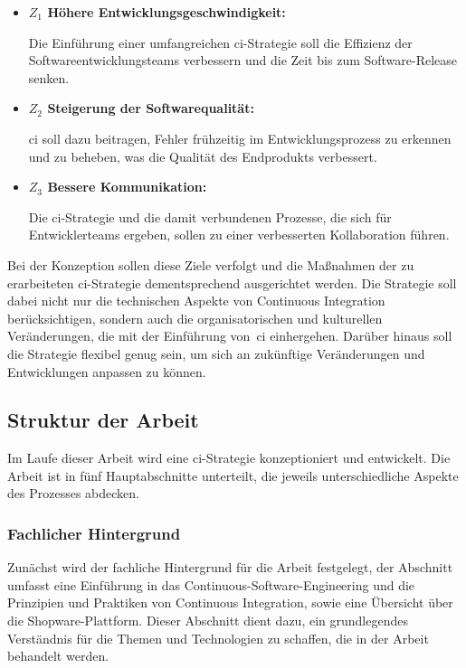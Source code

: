 \begin{itemize}
    \item {
        \textbf{$Z_1$ Höhere Entwicklungsgeschwindigkeit:}\par
        Die Einführung einer umfangreichen \acrshort{ci}-Strategie soll die Effizienz der Softwareentwicklungsteams
        verbessern und die Zeit bis zum Software-Release senken.
    }

    \item {
        \textbf{$Z_2$ Steigerung der Softwarequalität:}\par
        \acrshort{ci} soll dazu beitragen, Fehler frühzeitig im Entwicklungsprozess zu erkennen und zu beheben, was die
        Qualität des Endprodukts verbessert.
    }

    \item{
        \textbf{$Z_3$ Bessere Kommunikation:}\par
        Die \acrshort{ci}-Strategie und die damit verbundenen Prozesse, die sich für Entwicklerteams ergeben, sollen zu
        einer verbesserten Kollaboration führen.
    }
\end{itemize}

Bei der Konzeption sollen diese Ziele verfolgt und die Maßnahmen der zu erarbeiteten \acrshort{ci}-Strategie
dementsprechend ausgerichtet werden.
Die Strategie soll dabei nicht nur die technischen Aspekte von Continuous Integration berücksichtigen, sondern auch die
organisatorischen und kulturellen Veränderungen, die mit der Einführung von\ \acrshort{ci} einhergehen.
Darüber hinaus soll die Strategie flexibel genug sein, um sich an zukünftige Veränderungen und Entwicklungen anpassen
zu können.

\subsection{Struktur der Arbeit} \label{subsec:01-introduction-3}

Im Laufe dieser Arbeit wird eine \acrshort{ci}-Strategie konzeptioniert und entwickelt.
Die Arbeit ist in fünf Hauptabschnitte unterteilt, die jeweils unterschiedliche Aspekte des Prozesses abdecken.

\subsubsection{Fachlicher Hintergrund}

Zunächst wird der fachliche Hintergrund für die Arbeit festgelegt, der Abschnitt umfasst eine Einführung in das
Continuous-Software-Engineering und die Prinzipien und Praktiken von Continuous Integration, sowie eine Übersicht über die
Shopware-Plattform.
Dieser Abschnitt dient dazu, ein grundlegendes Verständnis für die Themen und Technologien zu schaffen, die in der
Arbeit behandelt werden.

